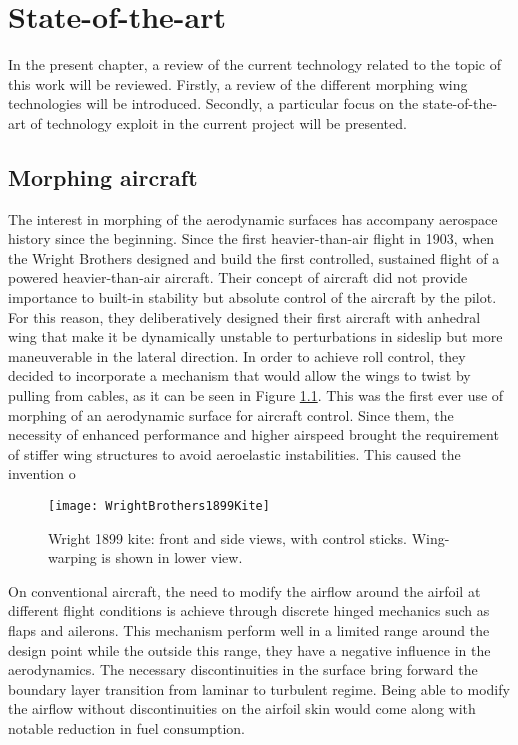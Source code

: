 \chapter{State-of-the-art} \label{chap:State_of_the_art}

In the present chapter, a review of the current technology related to the topic of this work will be reviewed. Firstly, a review of the different morphing wing technologies will be introduced. Secondly, a particular focus on the state-of-the-art of technology exploit in the current project will be presented.

\section{Morphing aircraft} \label{sec:Morphing_state}

The interest in morphing of the aerodynamic surfaces has accompany aerospace history since the beginning. Since the first heavier-than-air flight in 1903, when the Wright Brothers designed and build the first controlled, sustained flight of a powered heavier-than-air aircraft. Their concept of aircraft did not provide importance to built-in stability but absolute control of the aircraft by the pilot. For this reason, they deliberatively designed their first aircraft with anhedral wing that make it be dynamically unstable to perturbations in sideslip but more maneuverable in the lateral direction. In order to achieve roll control, they decided to incorporate a mechanism that would allow the wings to twist by pulling from cables, as it can be seen in Figure \ref{fig:Wright}. This was the first ever use of morphing of an aerodynamic surface for aircraft control. Since them, the necessity of enhanced performance and higher airspeed brought the requirement of stiffer wing structures to avoid aeroelastic instabilities. This caused the invention o

\begin{figure}[!htpb]
  \centering
  \texttt{[image: WrightBrothers1899Kite]}
  \caption[Wright Brothers 1899 kite]{Wright 1899 kite: front and side views, with control sticks. Wing-warping is shown in lower view. \cite{Wright}}\label{fig:Wright}
\end{figure}

On conventional aircraft, the need to modify the airflow around the airfoil at different flight conditions is achieve through discrete hinged mechanics such as flaps and ailerons. This mechanism perform well in a limited range around the design point while the outside this range, they have a negative influence in the aerodynamics. The necessary discontinuities in the surface bring forward the boundary layer transition from laminar to turbulent regime. Being able to modify the airflow without discontinuities on the airfoil skin would come along with notable reduction in fuel consumption.

